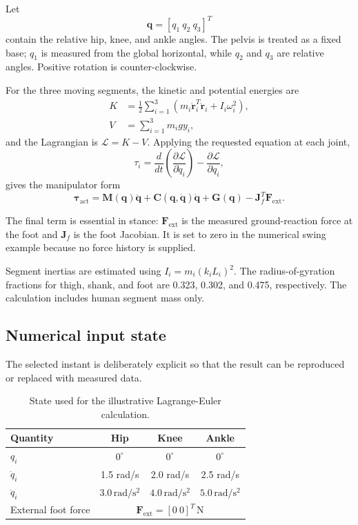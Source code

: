 \documentclass[11pt,a4paper]{article}
\newcommand{\unit}[1]{\ensuremath{\,\mathrm{#1}}}
\begin{document}
Let
\begin{equation}
  \mathbf q = [q_1\ q_2\ q_3]^T
\end{equation}
contain the relative hip, knee, and ankle angles. The pelvis is treated as a fixed base; $q_1$ is measured from the global horizontal, while $q_2$ and $q_3$ are relative angles. Positive rotation is counter-clockwise.

For the three moving segments, the kinetic and potential energies are
\begin{align}
K &= \frac{1}{2}\sum_{i=1}^{3}
  \left(m_i\dot{\mathbf r}_i^T\dot{\mathbf r}_i
  + I_i\omega_i^2\right),\\
V &= \sum_{i=1}^{3}m_i g y_i,
\end{align}
and the Lagrangian is $\mathcal L=K-V$. Applying the requested equation at each joint,
\begin{equation}
  \tau_i=\frac{d}{dt}\left(\frac{\partial\mathcal L}
  {\partial\dot q_i}\right)-\frac{\partial\mathcal L}{\partial q_i},
\end{equation}
gives the manipulator form
\begin{equation}
\boxed{\boldsymbol\tau_{\mathrm{act}}
=\mathbf M(\mathbf q)\ddot{\mathbf q}
+\mathbf C(\mathbf q,\dot{\mathbf q})\dot{\mathbf q}
+\mathbf G(\mathbf q)-\mathbf J_f^T\mathbf F_{\mathrm{ext}}.}
\end{equation}

The final term is essential in stance: $\mathbf F_{\mathrm{ext}}$ is the measured ground-reaction force at the foot and $\mathbf J_f$ is the foot Jacobian. It is set to zero in the numerical swing example because no force history is supplied.

Segment inertias are estimated using $I_i=m_i(k_iL_i)^2$. The radius-of-gyration fractions for thigh, shank, and foot are 0.323, 0.302, and 0.475, respectively. The calculation includes human segment mass only.

\subsection{Numerical input state}

The selected instant is deliberately explicit so that the result can be reproduced or replaced with measured data.

\begin{table}[H]
\centering
\caption{State used for the illustrative Lagrange-Euler calculation.}
\label{tab:lagrange-input}
\begin{tabular}{@{}lccc@{}}
\toprule
\textbf{Quantity} & \textbf{Hip} & \textbf{Knee} & \textbf{Ankle} \\
\midrule
$q_i$ & $0^\circ$ & $0^\circ$ & $0^\circ$ \\
$\dot q_i$ & 1.5 rad/s & 2.0 rad/s & 2.5 rad/s \\
$\ddot q_i$ & $3.0\unit{rad/s^2}$ & $4.0\unit{rad/s^2}$ & $5.0\unit{rad/s^2}$ \\
External foot force & \multicolumn{3}{c}{$\mathbf F_{\mathrm{ext}}=[0\ 0]^T\unit{N}$} \\
\bottomrule
\end{tabular}
\end{table}
\end{document}
